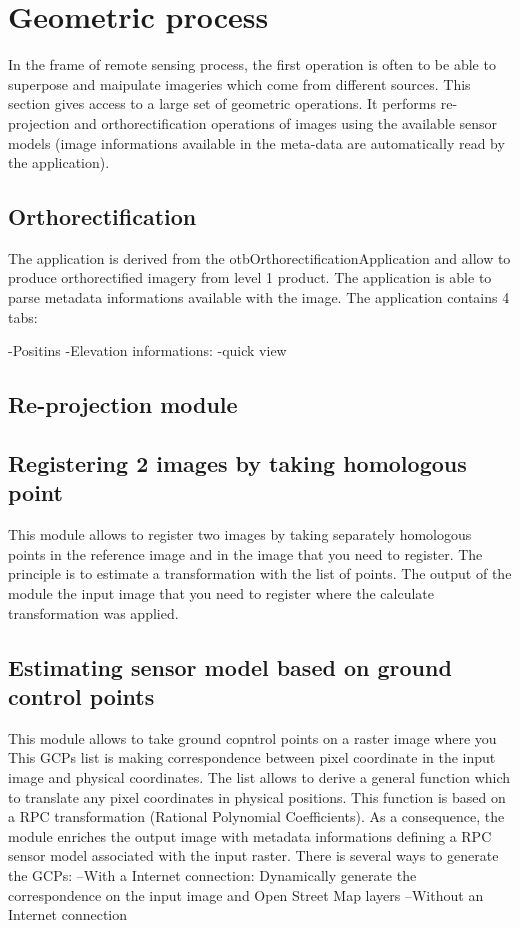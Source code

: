 \documentclass{InsightSoftwareGuide}
\begin{document}
\section{Geometric process}
In the frame of remote sensing process, the first operation is often to be able to superpose and maipulate imageries which 
come from different sources.
This section gives access to a large set of geometric operations.
It performs re-projection and orthorectification operations of images using the available sensor models 
(image informations available in the meta-data are automatically read by the application).  
\subsection{Orthorectification}
The application is derived from the otbOrthorectificationApplication and allow to produce orthorectified imagery from level 1 
product.
The application is able to parse metadata informations available with the image. The application contains 4 tabs:

-Positins
-Elevation informations: 
-quick view

\subsection{Re-projection module}
\subsection{Registering 2 images by taking homologous point}
This module allows to register two images by taking separately homologous points in the reference image and in the image 
that you need to register. The principle is to estimate a transformation with the list of points.
The output of the module the input image that you need to register where the calculate transformation was applied. 
\subsection{Estimating sensor model based on ground control points}
This module allows to take ground copntrol points on a raster image where you 
This GCPs list is making correspondence between pixel coordinate in the input image and physical coordinates. The list
allows to derive a general function which to translate any pixel coordinates in physical positions. This function is 
based on a RPC transformation (Rational Polynomial Coefficients). As a consequence, the module enriches the output image 
with metadata informations defining a RPC sensor model associated with the input raster. 
There is several ways to generate the GCPs:
--With a Internet connection: Dynamically generate the correspondence on the input image and Open Street Map layers
--Without an  Internet connection
\end{document}
